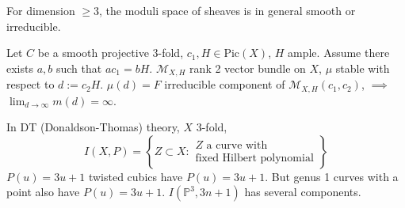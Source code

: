 For dimension $\geq 3$, the moduli space of sheaves is in general smooth or
irreducible.

\begin{theorem}[Ein]
\label{theorem-Ein}
Let $C$ be a smooth projective 3-fold, $c_1,H \in \text{Pic}(X)$, $H$ ample.
Assume there exists $a,b$ such that $ac_1=bH$. $\mathcal{M}_{X,H}$ rank 2 vector
bundle on $X$, $\mu$ stable with respect to $d:=c_2H$. $\mu(d)=F$ irreducible
component of $\mathcal{M}_{X,H}(c_1,c_2)$, $\implies $ 
$\lim_{d \to \infty} m(d)=\infty$.
\end{theorem}

\begin{example}
\label{example-}
In DT (Donaldson-Thomas) theory, $X$ 3-fold,
$$
I(X,P)=\left\{Z \subset X: \substack{Z \text{ a curve with} \\ 
\text{fixed Hilbert polynomial}}\right\}
$$
$P(u)=3u+1$ twisted cubics have  $P(u)=3u+1$. But genus 1 curves with a
point also have  $P(u)=3u+1$. $I(\mathbb{P}^3,3n+1)$ has several components.
\end{example}





